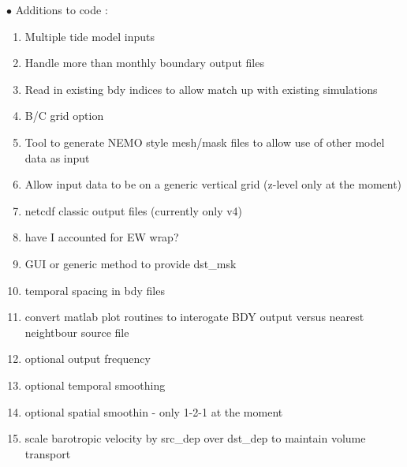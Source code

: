 $\bullet$ Additions to code :\\
\begin{enumerate}
\item Multiple tide model inputs
\item Handle more than monthly boundary output files
\item Read in existing bdy indices to allow match up with existing simulations
\item B/C grid option
\item Tool to generate NEMO style mesh/mask files to allow use of other model
      data as input
\item Allow input data to be on a generic vertical grid (z-level only at the moment)
\item netcdf classic output files (currently only v4)
\item have I accounted for EW wrap?
\item GUI or generic method to provide dst\_msk
\item temporal spacing in bdy files
\item convert matlab plot routines to interogate BDY output versus nearest neightbour
      source file
\item optional output frequency
\item optional temporal smoothing
\item optional spatial smoothin - only 1-2-1 at the moment
\item scale barotropic velocity by src\_dep over dst\_dep to maintain volume transport
\end{enumerate}
